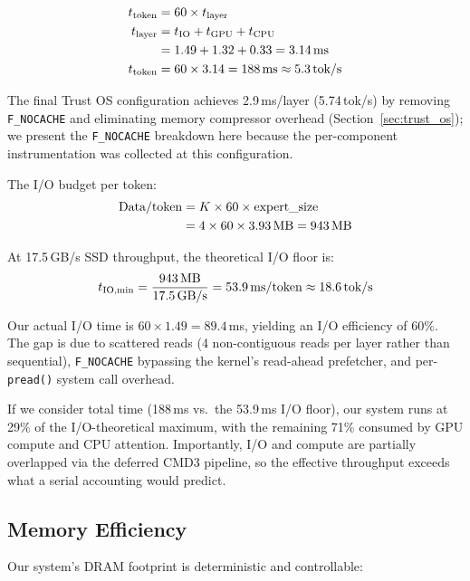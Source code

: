\documentclass[11pt,twocolumn]{article}
\begin{document}
\begin{align}
t_\text{token} &= 60 \times t_\text{layer} \nonumber \\
t_\text{layer} &= t_\text{IO} + t_\text{GPU} + t_\text{CPU} \nonumber \\
               &= 1.49 + 1.32 + 0.33 = 3.14\text{\,ms} \nonumber \\
t_\text{token} &= 60 \times 3.14 = 188\text{\,ms} \approx 5.3\text{\,tok/s} \nonumber
\end{align}

\noindent The final Trust OS configuration achieves 2.9\,ms/layer (5.74\,tok/s) by removing \texttt{F\_NOCACHE} and eliminating memory compressor overhead (Section~\ref{sec:trust_os}); we present the \texttt{F\_NOCACHE} breakdown here because the per-component instrumentation was collected at this configuration.

The I/O budget per token:
\begin{align}
\text{Data/token} &= K \times 60 \times \text{expert\_size} \nonumber \\
                  &= 4 \times 60 \times 3.93\text{\,MB} = 943\text{\,MB} \nonumber
\end{align}

At 17.5\,GB/s SSD throughput, the theoretical I/O floor is:
\begin{equation}
t_\text{IO,min} = \frac{943\text{\,MB}}{17.5\text{\,GB/s}} = 53.9\text{\,ms/token} \approx 18.6\text{\,tok/s}
\end{equation}

Our actual I/O time is $60 \times 1.49 = 89.4$\,ms, yielding an I/O efficiency of 60\%.
The gap is due to scattered reads (4 non-contiguous reads per layer rather than sequential), \texttt{F\_NOCACHE} bypassing the kernel's read-ahead prefetcher, and per-\texttt{pread()} system call overhead.

If we consider total time (188\,ms vs.\ the 53.9\,ms I/O floor), our system runs at 29\% of the I/O-theoretical maximum, with the remaining 71\% consumed by GPU compute and CPU attention.
Importantly, I/O and compute are partially overlapped via the deferred CMD3 pipeline, so the effective throughput exceeds what a serial accounting would predict.

\subsection{Memory Efficiency}

Our system's DRAM footprint is deterministic and controllable:
\end{document}
